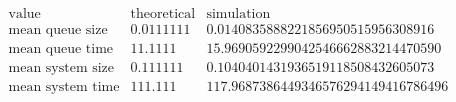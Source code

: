 \[\begin{array}{cccc}
 \text{value} & \text{theoretical} & \text{simulation} & \text{} \\
 \text{mean queue size} & 0.0111111 & 0.0140835888221856950515956308916 & \text{} \\
 \text{mean queue time} & 11.1111 & 15.9690592299042546662883214470590 & \text{} \\
 \text{mean system size} & 0.111111 & 0.1040401431936519118508432605073 & \text{} \\
 \text{mean system time} & 111.111 & 117.9687386449346576294149416786496 & \text{} \\
\end{array}\]


